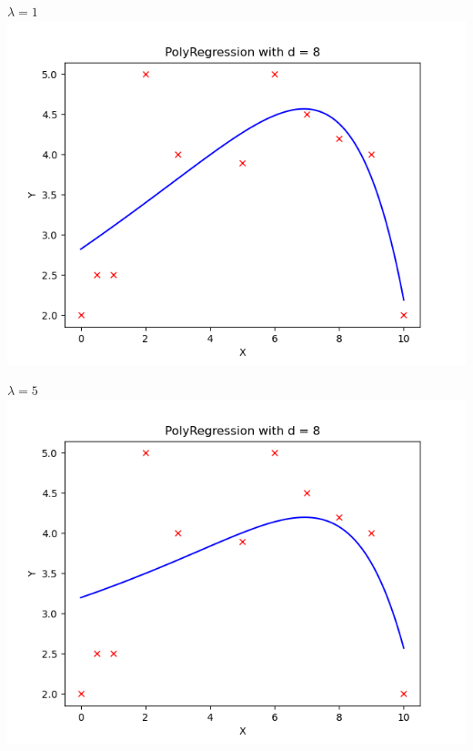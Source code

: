\documentclass{article}
\begin{document}
\begin{aprob}
\begin{tcolorbox}[colback=lightgray!10!white, colframe=black, title=A3]
\begin{center}
        \begin{minipage}{0.45\textwidth}
            \centering
            \textbf{$\lambda = 1$} \\[0.3em]
            \includegraphics[width=\textwidth]{PolyRegression1Regularization.png}
        \end{minipage}
        \hfill
        \begin{minipage}{0.45\textwidth}
            \centering
            \textbf{$\lambda = 5$} \\[0.3em]
            \includegraphics[width=\textwidth]{PolyRegression5Regularization.png}
        \end{minipage}
        
        \vspace{1em}
        

\end{center}
\end{tcolorbox}
\end{aprob}
\end{document}
